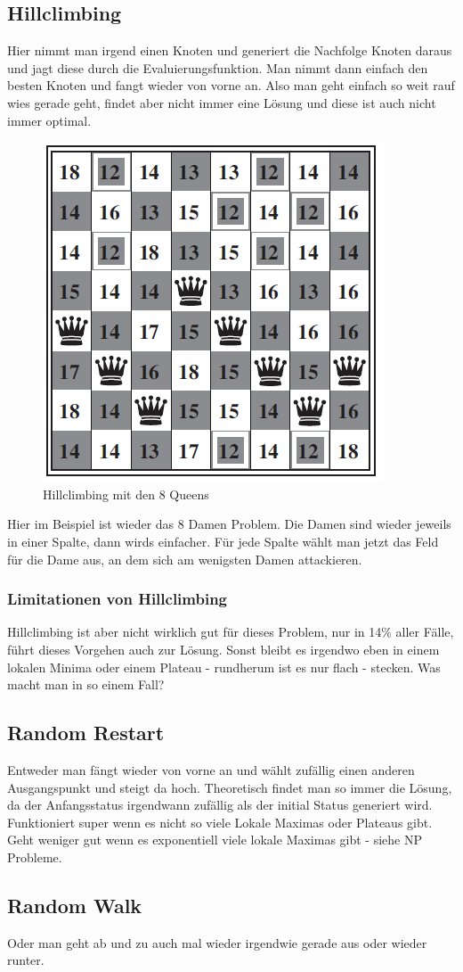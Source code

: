 \subsection{Hillclimbing}
Hier nimmt man irgend einen Knoten und generiert die Nachfolge Knoten daraus und jagt diese durch die Evaluierungsfunktion. Man nimmt dann einfach den besten Knoten und fangt wieder von vorne an. Also man geht einfach so weit rauf wies gerade geht, findet aber nicht immer eine Lösung und diese ist auch nicht immer optimal.
\begin{figure} [h!]
	\centering
	\includegraphics[width=0.4\linewidth]{fig/8queens_hillclimbing}
	\caption{Hillclimbing mit den 8 Queens}
	\label{fig:8queens_hillclimbing}
\end{figure}
Hier im Beispiel ist wieder das 8 Damen Problem. Die Damen sind wieder jeweils in einer Spalte, dann wirds einfacher. Für jede Spalte wählt man jetzt das Feld für die Dame aus, an dem sich am wenigsten Damen attackieren. 
\subsubsection{Limitationen von Hillclimbing}
Hillclimbing ist aber nicht wirklich gut für dieses Problem, nur in 14\% aller Fälle, führt dieses Vorgehen auch zur Lösung. Sonst bleibt es irgendwo eben in einem lokalen Minima oder einem Plateau - rundherum ist es nur flach - stecken. Was macht man in so einem Fall? 
\subsection{Random Restart}
Entweder man fängt wieder von vorne an und wählt zufällig einen anderen Ausgangspunkt und steigt da hoch. Theoretisch findet man so immer die Lösung, da der Anfangsstatus irgendwann zufällig als der initial Status generiert wird. Funktioniert super wenn es nicht so viele Lokale Maximas oder Plateaus gibt. Geht weniger gut wenn es exponentiell viele lokale Maximas gibt - siehe NP Probleme.
\subsection{Random Walk}
Oder man geht ab und zu auch mal wieder irgendwie gerade aus oder wieder runter.
